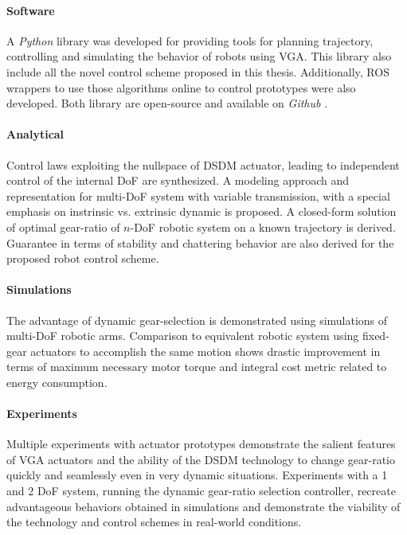 \paragraph{Software}
%
A \emph{Python} library was developed for providing tools for planning trajectory, controlling and simulating the behavior of robots using VGA. This library also include all the novel control scheme proposed in this thesis. Additionally, ROS wrappers to use those algorithms online to control prototypes were also developed. Both library are open-source and available on \emph{Github} \cite{girard_github.com/alx87grd/alexrobotics_2017}\cite{girard_github.com/alx87grd/dsdm_robotics_ros_2017}.


\paragraph{Analytical}
%
Control laws exploiting the nullspace of DSDM actuator, leading to independent control of the internal DoF are synthesized. A modeling approach and representation for multi-DoF system with variable transmission, with a special emphasis on instrinsic vs. extrinsic dynamic is proposed. A closed-form solution of optimal gear-ratio of $n$-DoF robotic system on a known trajectory is derived. Guarantee in terms of stability and chattering behavior are also derived for the proposed robot control scheme.

\paragraph{Simulations}
%
The advantage of dynamic gear-selection is demonstrated using simulations of multi-DoF robotic arms. Comparison to equivalent robotic system using fixed-gear actuators to accomplish the same motion shows drastic improvement in terms of maximum necessary motor torque and integral cost metric related to energy consumption. 

\paragraph{Experiments}
%
Multiple experiments with actuator prototypes demonstrate the salient features of VGA actuators and the ability of the DSDM technology to change gear-ratio quickly and seamlessly even in very dynamic situations. Experiments with a 1 and 2 DoF system, running the dynamic gear-ratio selection controller, recreate advantageous behaviors obtained in simulations and demonstrate the viability of the technology and control schemes in real-world conditions.


